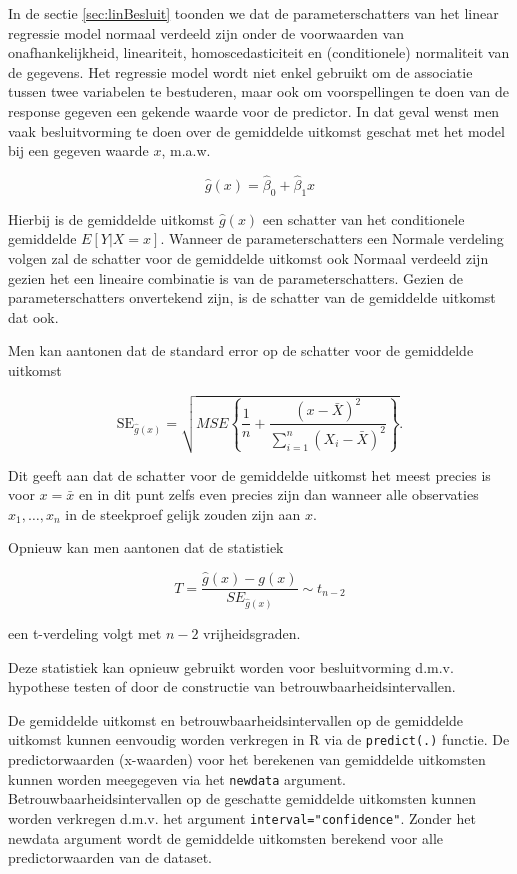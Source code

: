 \documentclass[
  12pt,dutch]{book}
\theoremstyle{definition}
\theoremstyle{definition}
\theoremstyle{definition}
\theoremstyle{definition}
\theoremstyle{remark}
\begin{document}
In de sectie \ref{sec:linBesluit} toonden we dat de parameterschatters van het linear regressie model normaal verdeeld zijn onder de voorwaarden van onafhankelijkheid, lineariteit, homoscedasticiteit en (conditionele) normaliteit van de gegevens.
Het regressie model wordt niet enkel gebruikt om de associatie tussen twee variabelen te bestuderen, maar ook om voorspellingen te doen van de response gegeven een gekende waarde voor de predictor.
In dat geval wenst men vaak besluitvorming te doen over de gemiddelde uitkomst geschat met het model bij een gegeven waarde \(x\), m.a.w.

\[\hat{g}(x)= \hat{\beta}_0 + \hat{\beta}_1 x\]

Hierbij is de gemiddelde uitkomst \(\hat{g}(x)\) een schatter van het conditionele gemiddelde \(E[Y\vert X=x]\).
Wanneer de parameterschatters een Normale verdeling volgen zal de schatter voor de gemiddelde uitkomst ook Normaal verdeeld zijn gezien het een lineaire combinatie is van de parameterschatters.
Gezien de parameterschatters onvertekend zijn, is de schatter van de gemiddelde uitkomst dat ook.

Men kan aantonen dat de standard error op de schatter voor de gemiddelde uitkomst

\[\text{SE}_{\hat{g}(x)}=\sqrt{MSE\left\{\frac{1}{n}+\frac{(x-\bar X)^2}{\sum\limits_{i=1}^n (X_i-\bar X)^2}\right\}}.\]

Dit geeft aan dat de schatter voor de gemiddelde uitkomst het meest precies is voor \(x=\bar x\) en in dit punt zelfs even precies zijn dan wanneer alle observaties \(x_1,\ldots, x_n\) in de steekproef gelijk zouden zijn aan \(x\).

Opnieuw kan men aantonen dat de statistiek

\[T=\frac{\hat{g}(x)-g(x)}{SE_{\hat{g}(x)}}\sim t_{n-2}\]

een t-verdeling volgt met \(n-2\) vrijheidsgraden.

Deze statistiek kan opnieuw gebruikt worden voor besluitvorming d.m.v. hypothese testen of door de constructie van betrouwbaarheidsintervallen.

De gemiddelde uitkomst en betrouwbaarheidsintervallen op de gemiddelde uitkomst kunnen eenvoudig worden verkregen in R via de \texttt{predict(.)} functie.
De predictorwaarden (x-waarden) voor het berekenen van gemiddelde uitkomsten kunnen worden meegegeven via het \texttt{newdata} argument.
Betrouwbaarheidsintervallen op de geschatte gemiddelde uitkomsten kunnen worden verkregen d.m.v. het argument \texttt{interval="confidence"}.
Zonder het newdata argument wordt de gemiddelde uitkomsten berekend voor alle predictorwaarden van de dataset.
\end{document}
